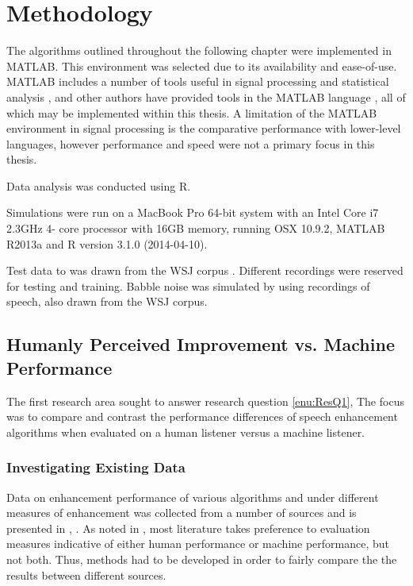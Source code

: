 
\chapter{Methodology}

\acresetall

The algorithms outlined throughout the following chapter were implemented
in MATLAB. This environment was selected due to its availability and
ease-of-use. MATLAB includes a number of tools useful in signal processing
and statistical analysis \citep{Krauss1994,Jones1997}, and other
authors have provided tools in the MATLAB language \citep{Hoyer2004,Brookes1997,Loizou2008,Wojcicki2011},
all of which may be implemented within this thesis. A limitation of
the MATLAB environment in signal processing is the comparative performance
with lower-level languages, however performance and speed were not
a primary focus in this thesis.

Data analysis was conducted using R.

Simulations were run on a MacBook Pro 64-bit system with an Intel
Core i7 2.3GHz 4- core processor with 16GB memory, running OSX 10.9.2,
MATLAB R2013a and R version 3.1.0 (2014-04-10).

Test data to was drawn from the \ac{WSJ} corpus \citep{Robinson1995}.
Different recordings were reserved for testing and training. Babble
noise was simulated by using recordings of speech, also drawn from
the \ac{WSJ} corpus.


\section{Humanly Perceived Improvement vs. Machine Performance}

The first research area sought to answer research question \vref{enu:ResQ1},
\textit{\RQone{}} The focus was to compare and contrast the performance
differences of speech enhancement algorithms when evaluated on a human
listener versus a machine listener.


\subsection{\label{sub:Method-Existing-Data}Investigating Existing Data}

Data on enhancement performance of various algorithms and under different
measures of enhancement was collected from a number of sources \citep{mohammadiha2013supervised,Wilson2008,Schmidt2006,Raj2005,Rennie2008,Weninger2011,Williamson2014,Paliwal2010,Plourde2007}
and is presented in , . As
noted in  \textit{},
most literature takes preference to evaluation measures indicative
of either human performance or machine performance, but not both.
Thus, methods had to be developed in order to fairly compare the the
results between different sources.

